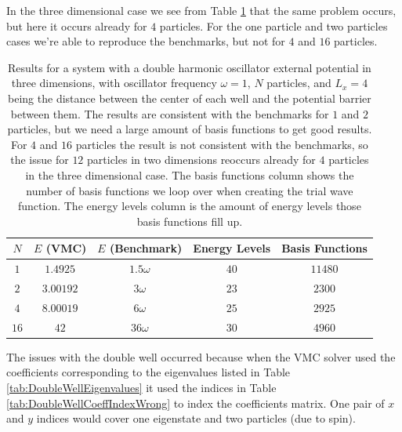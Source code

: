 \documentclass[../main.tex]{subfiles}
\begin{document}
In the three dimensional case we see from Table \ref{tab:DoubleHOTest3D} that the same problem occurs, but here it occurs already for $4$ particles. For the one particle and two particles cases we're able to reproduce the benchmarks, but not for $4$ and $16$ particles.

\begin{table}[!ht]
  \centering
  \begin{tabular}{ | c | c | c | c | c | }
    \hline
    $N$ & $E$ (VMC) & $E$ (Benchmark) &  Energy Levels & Basis Functions\\*
    \hline
    $1$ & $1.4925$ & $1.5\omega$ & $40$ & $11480$ \\*
    \hline
    $2$ & $3.00192$ & $3\omega$ & $23$ & $2300$ \\*
    \hline
    $4$ & $8.00019$ & $6\omega$ & $25$ & $2925$ \\*
    \hline
    $16$ & $42$ & $36\omega$ & $30$ & $4960$ \\*
    \hline
  \end{tabular}
  \caption{Results for a system with a double harmonic oscillator external potential in three dimensions, with oscillator frequency $\omega = 1$, $N$ particles, and $L_x = 4$ being the distance between the center of each well and the potential barrier between them. The results are consistent with the benchmarks for $1$ and $2$ particles, but we need a large amount of basis functions to get good results. For $4$ and $16$ particles the result is not consistent with the benchmarks, so the issue for $12$ particles in two dimensions reoccurs already for $4$ particles in the three dimensional case. The basis functions column shows the number of basis functions we loop over when creating the trial wave function. The energy levels column is the amount of energy levels those basis functions fill up.}
  \label{tab:DoubleHOTest3D}
\end{table}

The issues with the double well occurred because when the VMC solver used the coefficients corresponding to the eigenvalues listed in Table \ref{tab:DoubleWellEigenvalues} it used the indices in Table \ref{tab:DoubleWellCoeffIndexWrong} to index the coefficients matrix. One pair of $x$ and $y$ indices would cover one eigenstate and two particles (due to spin). 
\end{document}
